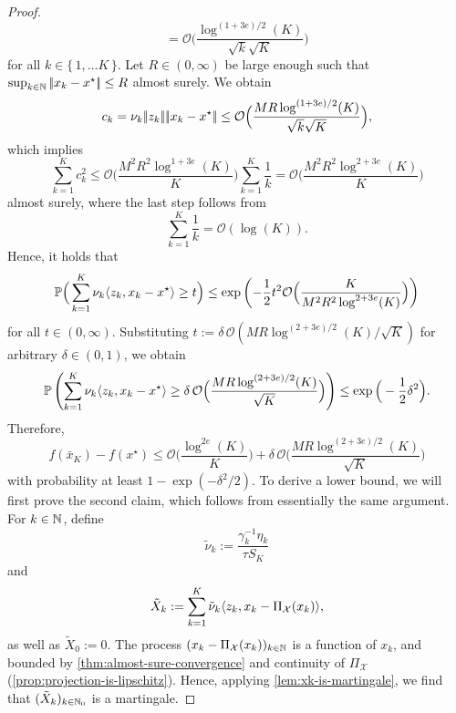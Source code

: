 \begin{proof}
\[        = \mathcal{O}\Big( \frac{\log^{(1 + 3e) / 2} (K)}{\sqrt{k} \sqrt{K}} \Big)
    \]
    for all $k\in \{\, 1,\dots K \,\}$.
    Let
    $R\in(0,\infty)$ be large enough
    such that $\sup_{k\in\mathbb{N}} |\!|x_k - x^\star|\!| \leq R$
    almost surely. 
    We obtain
    \[
        c_k
        = \nu_k |\!|z_k|\!| |\!|x_k - x^\star|\!|
        \leq \mathcal{O}\Big( \frac{M R \log^{(1 + 3e) / 2} (K)}{\sqrt{k} \sqrt{K}} \Big),
    \]
    which implies
    \[
        \sum_{k=1}^K c_k^2
        \leq \mathcal{O}\Big( \frac{M^2 R^2 \log^{1 + 3e}(K)}{K} \Big) \sum_{k=1}^K \frac{1}{k}
        = \mathcal{O}\Big( \frac{M^2 R^2 \log^{2 + 3e}(K)}{K} \Big)
    \]
    almost surely, where the last step follows from
    \[
        \sum_{k=1}^K \frac{1}{k} = \mathcal{O}(\log(K)).
    \]
    Hence, it holds that
    \[
        \mathbb{P}\Big( \sum_{k=1}^K \nu_k \langle z_k, x_k - x^\star \rangle \geq t \Big)
        \leq
        \exp\left(-\frac{1}{2}t^2 \mathcal{O}\Big(\frac{K}{M^2 R^2 \log^{2 + 3e}(K)}\Big) \right)
    \]
    for all $t \in (0,\infty)$. Substituting $t := \delta \, \mathcal{O}(MR \log^{(2+3e) / 2}(K) / \sqrt{K})$ for arbitrary $\delta \in (0, 1)$, we obtain
    \[
        \mathbb{P}\left( \sum_{k=1}^K \nu_k \langle z_k, x_k - x^\star \rangle
                    \geq
                    \delta \, \mathcal{O}\Big( \frac{MR\log^{(2 + 3e) / 2}(K)}{\sqrt{K}} \Big)
            \right)
        \leq
        \exp\Big( -\frac{1}{2} \delta^2 \Big).  
    \]
    Therefore,
    \begin{equation}
        \label{eq:proof:thm:convergence-with-high-probability:upper-bound-on-f-convex-case}
        f(\bar{x}_K) - f(x^\star)
        \leq
        \mathcal{O}\Big( \frac{\log^{2e}(K)}{K} \Big)
            + \delta \, \mathcal{O}\Big( \frac{MR\log^{(2 + 3e) / 2}(K)}{\sqrt{K}} \Big)
    \end{equation}
    with probability at least $1 - \exp(-\delta^2/2)$.
    To derive a lower bound, we will first prove the second claim, which follows from
    essentially the same argument. For $k\in\mathbb{N}$, define
    \[
        \tilde{\nu}_k := \frac{\gamma_k^{-1}\eta_k}{\tau S_K}
    \]
    and
    \[
        \tilde{X}_k := \sum_{k=1}^K \tilde{\nu}_k \langle z_k, x_k - \operatorname{\Pi_\mathcal{X}}(x_k) \rangle,
    \]
    as well as $\tilde{X}_0 := 0$.
    The process $(x_k - \operatorname{\Pi_\mathcal{X}}(x_k))_{k\in\mathbb{N}}$ is
    a function of $x_k$, and bounded by \cref{thm:almost-sure-convergence} and continuity
    of $\Pi_\mathcal{X}$ (\cref{prop:projection-is-lipschitz}).
    Hence, applying \cref{lem:xk-is-martingale}, we find that $(\tilde{X}_k)_{k\in\mathbb{N}_0}$ is a martingale.

\end{proof}
